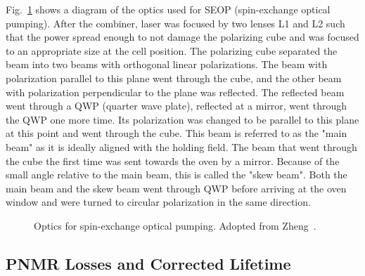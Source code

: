 Fig.~\ref{optics} shows a diagram of the optics used for SEOP (spin-exchange optical pumping). After the combiner, laser was focused by two lenses L1 and L2 such that the power spread enough to not damage the polarizing cube and was focused to an appropriate size at the cell position. The polarizing cube separated the beam into two beams with orthogonal linear polarizations. The beam with polarization parallel to this plane went through the cube, and the other beam with polarization perpendicular to the plane was reflected. The reflected beam went through a QWP (quarter wave plate), reflected at a mirror, went through the QWP one more time. Its polarization was changed to be parallel to this plane at this point and went through the cube. This beam is referred to as the "main beam" as it is ideally aligned with the holding field. The beam that went through the cube the first time was sent towards the oven by a mirror. Because of the small angle relative to the main beam, this is called the "skew beam". Both the main beam and the skew beam went through QWP before arriving at the oven window and were turned to circular polarization in the same direction.

\begin{figure}[t!]
	\centering
	\caption{{Optics for spin-exchange optical pumping. Adopted from Zheng~\cite{YuanThesis}.}}
	\label{optics}
\end{figure}

\subsection{PNMR Losses and Corrected Lifetime}






